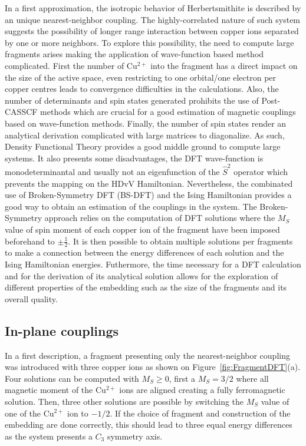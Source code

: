 \documentclass[12pt]{report}
\numberwithin{equation}{section}
\begin{document}
In a first approximation, the isotropic behavior of Herbertsmithite is described by an unique nearest-neighbor coupling. 
The highly-correlated nature of such system suggests the possibility of longer range interaction between copper ions separated by one or more neighbors. 
To explore this possibility, the need to compute large fragments arises making the application of wave-function based method complicated.
First the number of Cu$^{2+}$ into the fragment has a direct impact on the size of the active space, even restricting to one orbital/one electron per copper centres leads to convergence difficulties in the calculations.
Also, the number of determinants and spin states generated prohibits the use of Post-CASSCF methods which are crucial for a good estimation of magnetic couplings based on wave-function methods.
Finally, the number of spin states render an analytical derivation complicated with large matrices to diagonalize.
As such, Density Functional Theory provides a good middle ground to compute large systems. 
It also presents some disadvantages, the DFT wave-function is monodeterminantal and usually not an eigenfunction of the $\hat{S}^2$ operator which prevents the mapping on the HDvV Hamiltonian.
Nevertheless, the combinated use of Broken-Symmetry DFT (BS-DFT) and the Ising Hamiltonian provides a good way to obtain an estimation of the couplings in the system.
The Broken-Symmetry approach relies on the computation of DFT solutions where the $M_S$ value of spin moment of each copper ion of the fragment have been imposed beforehand to $\pm \frac{1}{2}$. 
It is then possible to obtain multiple solutions per fragments to make a connection between the energy differences of each solution and the Ising Hamiltonian energies.
Futhermore, the time necessary for a DFT calculation and for the derivation of its analytical solution allows for the exploration of different properties of the embedding such as the size of the fragments and its overall quality.


\subsection{In-plane couplings}

In a first description, a fragment presenting only the nearest-neighbor coupling was introduced with three copper ions as shown on Figure~\ref{fig:FragmentDFT}(a).
Four solutions can be computed with $M_S$$\ge$$0$, first a $M_S=3/2$ where all magnetic moment of the Cu$^{2+}$ ions are aligned creating a fully ferromagnetic solution. 
Then, three other solutions are possible by switching the $M_S$ value of one of the Cu$^{2+}$ ion to $-1/2$. 
If the choice of fragment and construction of the embedding are done correctly, this should lead to three equal energy differences as the system presents a $C_3$ symmetry axis.
\end{document}
